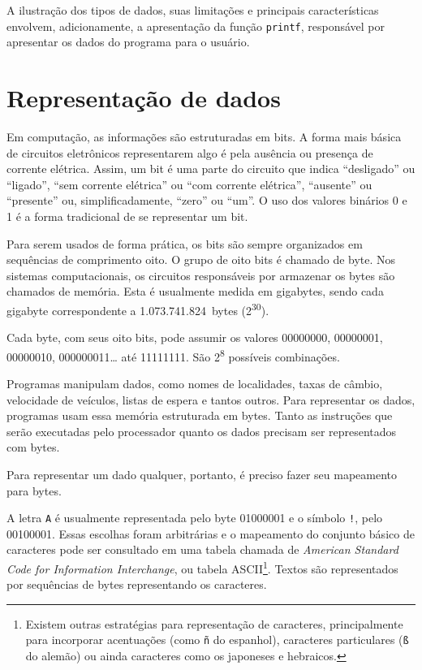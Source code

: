 \documentclass[
  11pt,
  a4paper,
]{scrbook}
\begin{document}
A ilustração dos tipos de dados, suas limitações e principais
características envolvem, adicionamente, a apresentação da função
\texttt{printf}, responsável por apresentar os dados do programa para o
usuário.

\section{Representação de dados}\label{sec-representacao-de-dados}

Em computação, as informações são estruturadas em bits. A forma mais
básica de circuitos eletrônicos representarem algo é pela ausência ou
presença de corrente elétrica. Assim, um bit é uma parte do circuito que
indica ``desligado'' ou ``ligado'', ``sem corrente elétrica'' ou ``com
corrente elétrica'', ``ausente'' ou ``presente'' ou, simplificadamente,
``zero'' ou ``um''. O uso dos valores binários 0 e 1 é a forma
tradicional de se representar um bit.

Para serem usados de forma prática, os bits são sempre organizados em
sequências de comprimento oito. O grupo de oito bits é chamado de byte.
Nos sistemas computacionais, os circuitos responsáveis por armazenar os
bytes são chamados de memória. Esta é usualmente medida em gigabytes,
sendo cada gigabyte correspondente a 1.073.741.824~bytes
(2\textsuperscript{30}).

Cada byte, com seus oito bits, pode assumir os valores 00000000,
00000001, 00000010, 000000011\ldots{} até 11111111. São
2\textsuperscript{8} possíveis combinações.

Programas manipulam dados, como nomes de localidades, taxas de câmbio,
velocidade de veículos, listas de espera e tantos outros. Para
representar os dados, programas usam essa memória estruturada em bytes.
Tanto as instruções que serão executadas pelo processador quanto os
dados precisam ser representados com bytes.

Para representar um dado qualquer, portanto, é preciso fazer seu
mapeamento para bytes.

A letra \texttt{A} é usualmente representada pelo byte 01000001 e o
símbolo \texttt{!}, pelo 00100001. Essas escolhas foram arbitrárias e o
mapeamento do conjunto básico de caracteres pode ser consultado em uma
tabela chamada de \emph{American Standard Code for Information
Interchange}, ou tabela ASCII\footnote{Existem outras estratégias para
  representação de caracteres, principalmente para incorporar
  acentuações (como \texttt{ñ} do espanhol), caracteres particulares
  (\texttt{ß} do alemão) ou ainda caracteres como os japoneses e
  hebraicos.}. Textos são representados por sequências de bytes
representando os caracteres.
\end{document}
